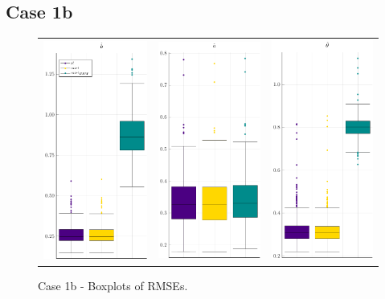 \subsection{Case 1b}
\begin{figure}[H] 
	\centering \begin{tabular}[b]{c c c}
		\includegraphics[width=.3\textwidth]{Figures/1b/RMSE_b.pdf} & \includegraphics[width=.3\textwidth]{Figures/1b/RMSE_a.pdf} & \includegraphics[width=.3\textwidth]{Figures/1b/RMSE_t.pdf}
	\end{tabular}
	\caption{Case 1b - Boxplots of RMSEs.}
	\label{fig:bpRMSE1b}
\end{figure}
